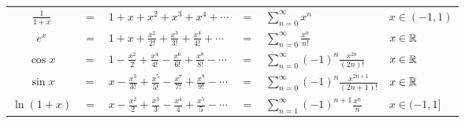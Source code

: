 \begin{center} 
   \begin{tabular}{clllll}
    \hline
    $\displaystyle \frac{1}{1+x}$ & $ = $ & $1 + x + x^2 + x^3 + x^4 + \cdots$ & $=$ & $\displaystyle \sum_{n=0}^\infty x^n$ & $x \in (-1,1)$ \\
    $e^x$ & $=$ & $\displaystyle 1 + x + \frac{x^2}{2!} + \frac{x^3}{3!} + \frac{x^4}{4!} + \cdots$ & $=$ & $\displaystyle \sum_{n=0}^\infty \frac{x^n}{n!}$ & $x \in \mathbb{R}$ \\
    $\cos x$ & $=$ & $\displaystyle 1 - \frac{x^2}{2} + \frac{x^4}{4!} - \frac{x^6}{6!} + \frac{x^8}{8!} - \cdots$ & $=$ & $\displaystyle \sum_{n=0}^\infty (-1)^n \frac{x^{2n}}{(2n)!}$ & $x \in \mathbb{R}$ \\
    $\sin x$ & $=$ & $\displaystyle x - \frac{x^3}{3!} + \frac{x^5}{5!} - \frac{x^7}{7!} + \frac{x^9}{9!} - \cdots$ & $=$ & $\displaystyle \sum_{n=0}^\infty (-1)^n \frac{x^{2n+1}}{(2n+1)!}$ & $x \in \mathbb{R}$ \\
    $\ln (1+x)$ & $=$ & $\displaystyle x - \frac{x^2}{2} + \frac{x^3}{3} - \frac{x^4}{4} + \frac{x^5}{5} - \cdots$ & $=$ & $\displaystyle \sum_{n=1}^\infty (-1)^{n+1} \frac{x^n}{n}$ & $x \in (-1, 1]$ \\
    \hline
\end{tabular} 
\end{center}
























































